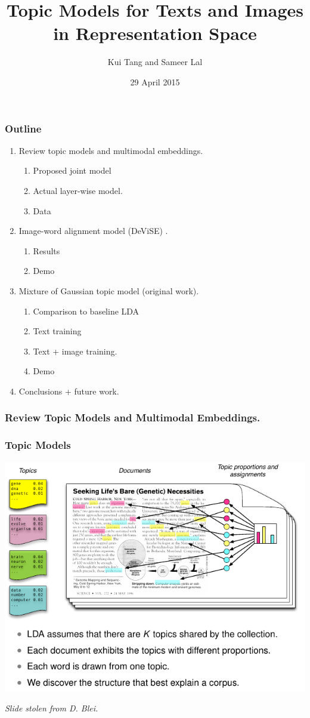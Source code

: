 \documentclass{beamer}
\title{Topic Models for Texts and Images in Representation Space}
\author{Kui Tang and Sameer Lal}
\institute{Columbia University}
\date{29 April 2015}
\begin{document}
\frame{\titlepage}

\begin{frame}
  \frametitle{Outline}
  \begin{enumerate}
    \item Review topic models and multimodal embeddings.
      \begin{enumerate}
        \item Proposed joint model
        \item Actual layer-wise model.
        \item Data
      \end{enumerate}
    \item Image-word alignment model (DeViSE) \citep{Frome13}.
      \begin{enumerate}
        \item Results
        \item Demo
      \end{enumerate}
    \item Mixture of Gaussian topic model (original work).
    \begin{enumerate}
      \item Comparison to baseline LDA
      \item Text training
      \item Text + image training. 
      \item Demo
    \end{enumerate}
    \item Conclusions + future work.
  \end{enumerate}
\end{frame}

\begin{frame}
  \frametitle{Review Topic Models and Multimodal Embeddings.}
\end{frame}

\begin{frame}
  \frametitle{Topic Models}
  {\centering \includegraphics[width=\textwidth]{assets/lda_colors.pdf}}
  {\small \emph{Slide stolen from D. Blei.} \par}
\end{frame}
\end{document}
